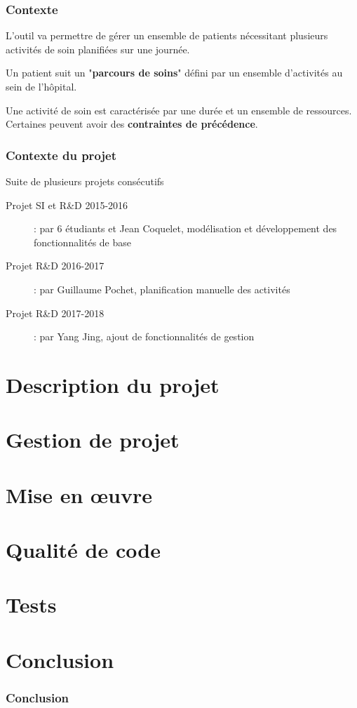 \documentclass{beamer}
\begin{document}
\begin{frame}
\frametitle{Contexte}

L'outil va permettre de gérer un ensemble de patients nécessitant plusieurs activités de soin planifiées sur une journée.

\bigbreak

Un patient suit un "\textbf{parcours de soins}" défini par un ensemble d'activités au sein de l'hôpital.

\bigbreak

Une activité de soin est caractérisée par une durée et un ensemble de ressources. Certaines peuvent avoir des \textbf{contraintes de précédence}. 

\end{frame}


\begin{frame}
\frametitle{Contexte du projet}

\begin{block}{Suite de plusieurs projets consécutifs}
	\begin{description}
		\item[Projet SI et R\&D 2015-2016]: par 6 étudiants et Jean Coquelet, modélisation et développement des fonctionnalités de base
		\item[Projet R\&D 2016-2017]: par Guillaume Pochet, planification manuelle des activités
		\item[Projet R\&D 2017-2018]: par Yang Jing, ajout de fonctionnalités de gestion
	\end{description}
\end{block}

\end{frame}

\section[Description]{Description du projet}


\section[Gestion de projet]{Gestion de projet}



\section{Mise en œuvre}


\section{Qualité de code}




\section{Tests}



\section*{Conclusion}

\begin{frame}
\frametitle{Conclusion}


\end{frame}
\end{document}
